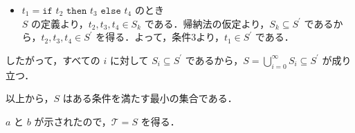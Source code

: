 \documentclass[a4paper,11pt,fleqn,dvipdfmx]{article}
\newcommand{\qed}[0]{\hfill\fbox{}}
\newcommand\Tau{\mathcal{T}}
\newcommand{\kakko}[1]{\raisebox{.2ex}{(}#1\raisebox{.2ex}{)}}
\begin{document}
\begin{itemize}
\begin{itemize}
\begin{itemize}
                            $S$ の定義より， $t_2 \in S_k$ である．帰納法の仮定より，$S_k \subseteq S^\prime$ であるから，$t_2 \in S^\prime$ を得る．よって，条件\kakko{2}より，$t_1 \in S^\prime$ である．
                        \item $t_1 = \texttt{if } t_2 \texttt{ then } t_3 \texttt{ else } t_4$ のとき \\[2mm]
                            $S$ の定義より，$t_2, t_3, t_4 \in S_k$ である．帰納法の仮定より，$S_k \subseteq S^\prime$ であるから，$t_2, t_3, t_4 \in S^\prime$ を得る．よって，条件\kakko{3}より，$t_1 \in S^\prime$ である．
                    \end{itemize}
                したがって，すべての $i$ に対して $S_i \subseteq S^\prime$ であるから，$S = \displaystyle \bigcup_{i=0}^{\infty} S_i \subseteq S^\prime$ が成り立つ．
            \end{itemize}
            以上から，$S$ はある条件を満たす最小の集合である．
        \end{itemize}
        \kakko{$a$} と \kakko{$b$} が示されたので，$\Tau = S$ を得る．\qed

    \vspace{10mm}
\end{document}
